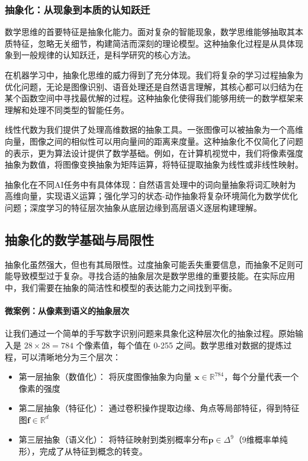 \subsubsection{抽象化：从现象到本质的认知跃迁}

数学思维的首要特征是抽象化能力。面对复杂的智能现象，数学思维能够抽取其本质特征，忽略无关细节，构建简洁而深刻的理论模型。这种抽象化过程是从具体现象到一般规律的认知跃迁，是科学研究的核心方法。

在机器学习中，抽象化思维的威力得到了充分体现。我们将复杂的学习过程抽象为优化问题，无论是图像识别、语音处理还是自然语言理解，其核心都可以归结为在某个函数空间中寻找最优解的过程。这种抽象化使得我们能够用统一的数学框架来理解和处理不同类型的智能任务。

线性代数为我们提供了处理高维数据的抽象工具。一张图像可以被抽象为一个高维向量，图像之间的相似性可以用向量间的距离来度量。这种抽象化不仅简化了问题的表示，更为算法设计提供了数学基础。例如，在计算机视觉中，我们将像素强度抽象为数值，将图像变换抽象为矩阵运算，将特征提取抽象为线性或非线性映射。

抽象化在不同AI任务中有具体体现：自然语言处理中的词向量抽象将词汇映射为高维向量，实现语义运算；强化学习的状态-动作抽象将复杂环境简化为数学优化问题；深度学习的特征层次抽象从底层边缘到高层语义逐层构建理解。

\subsection*{抽象化的数学基础与局限性}

抽象化虽然强大，但也有其局限性。过度抽象可能丢失重要信息，而抽象不足则可能导致模型过于复杂。寻找合适的抽象层次是数学思维的重要技能。在实际应用中，我们需要在抽象的简洁性和模型的表达能力之间找到平衡。

\paragraph{微案例：从像素到语义的抽象层次}

让我们通过一个简单的手写数字识别问题来具象化这种层次化的抽象过程。原始输入是 $28 \times 28 = 784$ 个像素值，每个值在 0-255 之间。数学思维对数据的提炼过程，可以清晰地分为三个层次：

\begin{itemize}
\item 第一层抽象（数值化）： 将灰度图像抽象为向量 $\mathbf{x} \in \mathbb{R}^{784}$，每个分量代表一个像素的强度
\item 第二层抽象（特征化）： 通过卷积操作提取边缘、角点等局部特征，得到特征图$\mathbf{f} \in \mathbb{R}^{d}$
\item 第三层抽象（语义化）： 将特征映射到类别概率分布$\mathbf{p} \in \Delta^{9}$（9维概率单纯形），完成了从特征到概念的转变。
\end{itemize}

